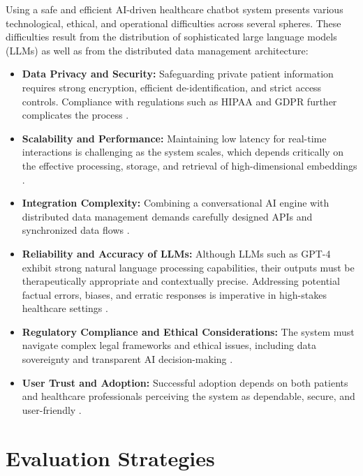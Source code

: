 Using a safe and efficient AI-driven healthcare chatbot system presents various technological, ethical, and operational difficulties across several spheres. These difficulties result from the distribution of sophisticated large language models (LLMs) as well as from the distributed data management architecture:
\begin{itemize}[itemsep=2em]
    \item \textbf{Data Privacy and Security:}  
          Safeguarding private patient information requires strong encryption, efficient de-identification, and strict access controls. Compliance with regulations such as HIPAA \cite{hipaa1996} and GDPR \cite{eu2016} further complicates the process \cite{pan2020}.
          
    \item \textbf{Scalability and Performance:}  
          Maintaining low latency for real-time interactions is challenging as the system scales, which depends critically on the effective processing, storage, and retrieval of high-dimensional embeddings \cite{qiu2023}.
          
    \item \textbf{Integration Complexity:}  
          Combining a conversational AI engine with distributed data management demands carefully designed APIs and synchronized data flows \cite{dhurandhar2024}.
          
    \item \textbf{Reliability and Accuracy of LLMs:}  
          Although LLMs such as GPT-4 exhibit strong natural language processing capabilities, their outputs must be therapeutically appropriate and contextually precise. Addressing potential factual errors, biases, and erratic responses is imperative in high-stakes healthcare settings \cite{gpt4tech, ullah2024}.
          
    \item \textbf{Regulatory Compliance and Ethical Considerations:}  
          The system must navigate complex legal frameworks and ethical issues, including data sovereignty and transparent AI decision-making \cite{ueda2024, harding2023}.
          
    \item \textbf{User Trust and Adoption:}  
          Successful adoption depends on both patients and healthcare professionals perceiving the system as dependable, secure, and user-friendly \cite{vaishya2023}.
\end{itemize}

\section{Evaluation Strategies}

